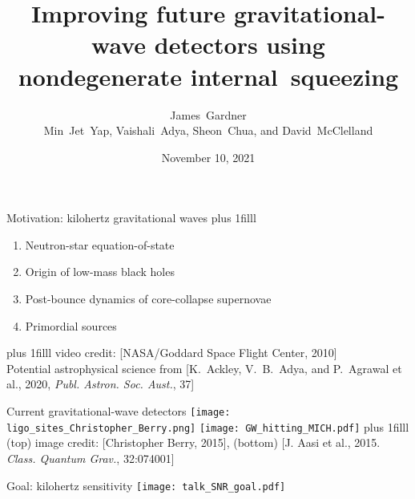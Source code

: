 \documentclass[12pt,xcolor=dvipsnames]{beamer}
\title[]{Improving future gravitational-wave detectors using nondegenerate internal~squeezing}
\author[James Gardner]{\texorpdfstring{\large{James~Gardner}\\\small{Min~Jet~Yap, Vaishali~Adya, Sheon~Chua, and David~McClelland}}{James~Gardner}}
\institute[]{\small The Centre for Gravitational Astrophysics, ANU}
\date{November 10, 2021}
\newcommand{\vframefill}{\vskip0pt plus 1filll}
\begin{document}

{
  \begin{frame}[label=titleframe,noframenumbering]
  \titlepage
  \end{frame}
}

\begin{frame}{Motivation: kilohertz gravitational waves}
\centering
{}
\vframefill
\begin{enumerate}
\item Neutron-star equation-of-state %
\item Origin of low-mass black holes
\item Post-bounce dynamics of core-collapse supernovae
\item Primordial sources %
\end{enumerate}
\vframefill
\centering
{\tiny video credit: [NASA/Goddard Space Flight Center, 2010]}\\
{\vspace{-0.2cm}\tiny Potential astrophysical science from [K.~Ackley, V.~B.~Adya, and P.~Agrawal et al., 2020, \emph{Publ. Astron. Soc. Aust.}, 37]} %
\end{frame}

\begin{frame}{Current gravitational-wave detectors}
\centering
\texttt{[image: ligo\_sites\_Christopher\_Berry.png]}
\texttt{[image: GW\_hitting\_MICH.pdf]}
\vframefill
{\tiny (top) image credit: [Christopher Berry, 2015], (bottom) [J. Aasi et al., 2015. \emph{Class. Quantum Grav.}, 32:074001]}
\end{frame}

\begin{frame}{Goal: kilohertz sensitivity}
\centering
\texttt{[image: talk\_SNR\_goal.pdf]}
\end{frame}
\end{document}
